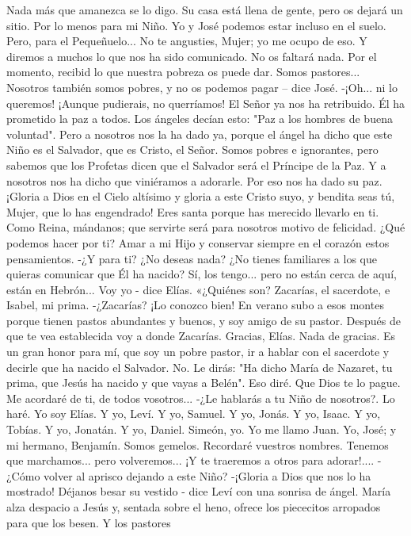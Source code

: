 \documentclass[12pt]{book} %
\begin{document}
Nada más que amanezca se lo digo. Su casa está llena de gente, pero os dejará un sitio. 
Por lo menos para mi Niño. Yo y José podemos estar incluso en el suelo. Pero, para el Pequeñuelo... 
No te angusties, Mujer; yo me ocupo de eso. Y diremos a muchos lo que nos ha sido comunicado. No os faltará nada. Por el momento, recibid lo que nuestra pobreza os puede dar. Somos pastores... 
Nosotros también somos pobres, y no os podemos pagar – dice José. 
-¡Oh... ni lo queremos! ¡Aunque pudierais, no querríamos! El Señor ya nos ha retribuido. Él ha prometido la paz a todos. Los ángeles decían esto: "Paz a los hombres de buena voluntad". Pero a nosotros nos la ha dado ya, porque el ángel ha dicho que este Niño es el Salvador, que es Cristo, el Señor. Somos pobres e ignorantes, pero sabemos que los Profetas dicen que el Salvador será el Príncipe de la Paz. Y a nosotros nos ha dicho que viniéramos a adorarle. Por eso nos ha dado su paz. ¡Gloria a Dios en el Cielo altísimo y gloria a este Cristo suyo, y bendita seas tú, Mujer, que lo has engendrado! Eres santa porque has merecido llevarlo en ti. Como Reina, mándanos; que servirte será para nosotros motivo de felicidad. ¿Qué podemos hacer por ti? 
Amar a mi Hijo y conservar siempre en el corazón estos pensamientos. 
-¿Y para ti? ¿No deseas nada? ¿No tienes familiares a los que quieras comunicar que Él ha nacido? 
Sí, los tengo... pero no están cerca de aquí, están en Hebrón... 
Voy yo - dice Elías. «¿Quiénes son? 
Zacarías, el sacerdote, e Isabel, mi prima. 
-¿Zacarías? ¡Lo conozco bien! En verano subo a esos montes porque tienen pastos abundantes y buenos, y soy amigo de 
su pastor. 
Después de que te vea establecida voy a donde Zacarías. 
Gracias, Elías.                     
Nada de gracias. Es un gran honor para mí, que soy un pobre pastor, ir a hablar con el sacerdote y decirle que ha 
nacido el Salvador.                             
No. Le dirás: "Ha dicho María de Nazaret, tu prima, que Jesús ha nacido y que vayas a Belén". 
Eso diré. 
Que Dios te lo pague. Me acordaré de ti, de todos vosotros... 
-¿Le hablarás a tu Niño de nosotros?. 
Lo haré. 
Yo soy Elías. 
Y yo, Leví. 
Y yo, Samuel. 
Y yo, Jonás. 
Y yo, Isaac. 
Y yo, Tobías. 
Y yo, Jonatán. 
Y yo, Daniel. 
Simeón, yo. 
Yo me llamo Juan. 
Yo, José; y mi hermano, Benjamín. Somos gemelos. 
Recordaré vuestros nombres. 
Tenemos que marchamos... pero volveremos... ¡Y te traeremos a otros para adorar!.... 
-¿Cómo volver al aprisco dejando a este Niño? 
-¡Gloria a Dios que nos lo ha mostrado! 
Déjanos besar su vestido - dice Leví con una sonrisa de ángel. 
María alza despacio a Jesús y, sentada sobre el heno, ofrece los piececitos arropados para que los besen. Y los pastores 
\end{document}
